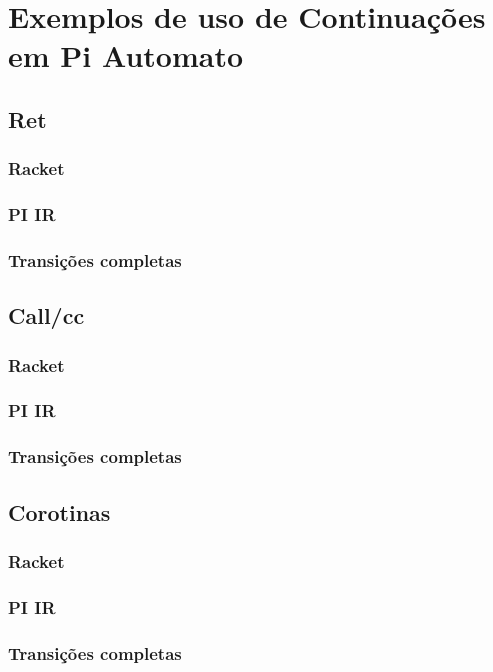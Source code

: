\chapter{Exemplos de uso de Continuações em Pi Automato}\label{cap4}

\section{Ret}
\subsection{Racket}
\subsection{PI IR}
\subsection{Transições completas}
\section{Call/cc}
\subsection{Racket}
\subsection{PI IR}
\subsection{Transições completas}
\section{Corotinas}
\subsection{Racket}
\subsection{PI IR}
\subsection{Transições completas}
